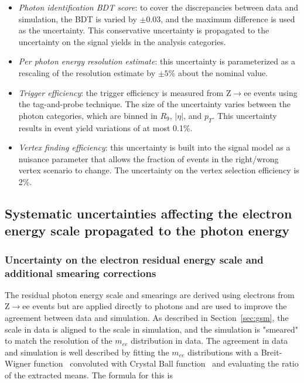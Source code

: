 \begin{itemize}
    \item \textit{Photon identification BDT score}: to cover the discrepancies between data and simulation, the BDT is varied by $\pm0.03$, and the maximum difference is used as the uncertainty. This conservative uncertainty is propagated to the uncertainty on the signal yields in the analysis categories. 
    \item \textit{Per photon energy resolution estimate}: this uncertainty is parameterized as a rescaling of the resolution estimate by $\pm 5\%$ about the nominal value.
    \item \textit{Trigger efficiency}: the trigger efficiency is measured from Z$\rightarrow$ee events using the tag-and-probe technique. The size of the uncertainty varies between the photon categories, which are binned in $R_9$, $|\eta|$, and $p_T$. This uncertainty results in event yield variations of at most 0.1\%.
    \item \textit{Vertex finding efficiency}: this uncertainty is built into the signal model as a nuisance parameter that allows the fraction of events in the right/wrong vertex scenario to change. The uncertainty on the vertex selection efficiency is 2\%. 

\end{itemize}

\subsection{Systematic uncertainties affecting the electron energy scale propagated to the photon energy}

\subsubsection{Uncertainty on the electron residual energy scale and additional smearing corrections}

The residual photon energy scale and smearings are derived using electrons from Z$\rightarrow$ee events but are applied directly to photons and are used to improve the agreement between data and simulation. As described in Section~\ref{sec:gsm}, the scale in data is aligned to the scale in simulation, and the simulation is "smeared" to match the resolution of the $m_{ee}$ distribution in data. The agreement in data and simulation is well described by fitting the $m_{ee}$ distributions with a Breit-Wigner function~\cite{pdg} convoluted with Crystal Ball function~\cite{crystal_ball} and evaluating the ratio of the extracted means. The formula for this is 

